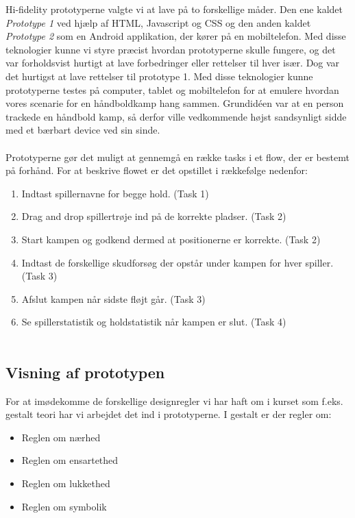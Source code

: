 Hi-fidelity prototyperne valgte vi at lave på to forskellige måder. Den ene kaldet \emph{Prototype 1} ved hjælp af HTML, Javascript og CSS og den anden kaldet \emph{Prototype 2} som en Android applikation, der kører på en mobiltelefon. Med disse teknologier kunne vi styre præcist hvordan prototyperne skulle fungere, og det var forholdsvist hurtigt at lave forbedringer eller rettelser til hver især. Dog var det hurtigst at lave rettelser til prototype 1. Med disse teknologier kunne prototyperne testes på computer, tablet og mobiltelefon for at emulere hvordan vores scenarie for en håndboldkamp hang sammen. Grundidéen var at en person trackede en håndbold kamp, så derfor ville vedkommende højst sandsynligt sidde med et bærbart device ved sin sinde.\\\\Prototyperne gør det muligt at gennemgå en række tasks i et flow, der er bestemt på forhånd. For at beskrive flowet er det opstillet i rækkefølge nedenfor:
\begin{enumerate}
\item Indtast spillernavne for begge hold. (Task 1)
\item Drag and drop spillertrøje ind på de korrekte pladser. (Task 2)
\item Start kampen og godkend dermed at positionerne er korrekte. (Task 2)
\item Indtast de forskellige skudforsøg der opstår under kampen for hver spiller. (Task 3)
\item Afslut kampen når sidste fløjt går. (Task 3)
\item Se spillerstatistik og holdstatistik når kampen er slut. (Task 4)\\\\
\end{enumerate} 

\newpage
\subsection*{Visning af prototypen}
For at imødekomme de forskellige designregler vi har haft om i kurset som f.eks. gestalt teori har vi arbejdet det ind i prototyperne. I gestalt er der regler om:
\begin{itemize}
\item Reglen om nærhed
\item Reglen om ensartethed
\item Reglen om lukkethed
\item Reglen om symbolik\\
\end{itemize}


